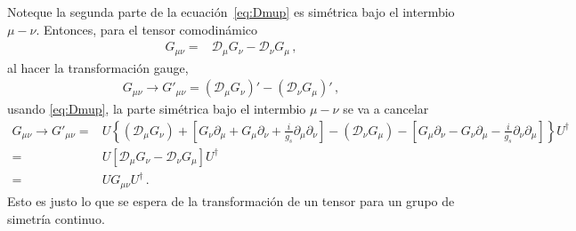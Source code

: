 Noteque la segunda parte de la ecuación~\eqref{eq:Dmup} es simétrica bajo el intermbio $\mu-\nu$. Entonces,  para el tensor comodinámico
\begin{align}
  \label{eq:gmunu3}
   {G}_{\mu\nu}= & \mathcal{D}_{\mu} {G}_{\nu}-\mathcal{D}_{\nu} {G}_{\mu}\,,
\end{align}
al hacer la transformación gauge, 
\begin{align}
   {G}_{\mu\nu}\to  {G}'_{\mu\nu}=\left( \mathcal{D}_{\mu} {G}_{\nu} \right)'-\left( \mathcal{D}_{\nu} {G}_{\mu}  \right)'\,,
\end{align}
usando \eqref{eq:Dmup}, la parte simétrica bajo el intermbio $\mu-\nu$ se va a cancelar
\begin{align}
\label{eq:ugum}
    {G}_{\mu\nu}\to  {G}'_{\mu\nu}=&  {U} \left\{ \left( \mathcal{D}_{\mu}{G}_\nu   \right)
    +  \left[ {G}_{\nu} \partial_{\mu}+{G}_{\mu}\partial_{\nu}+\frac{i}{g_s} \partial_{\mu}\partial_{\nu} \right]
  -   \left( \mathcal{D}_{\nu}{G}_\mu   \right)
    - \left[ {G}_{\mu} \partial_{\nu}-{G}_{\nu}\partial_{\mu}-\frac{i}{g_s} \partial_{\nu}\partial_{\mu} \right]  \right\} {U}^{\dagger} \nonumber\\
=&  {U} \left[  \mathcal{D}_{\mu}{G}_\nu 
    -   \mathcal{D}_{\nu}{G}_\mu
  \right] {U}^{\dagger} \nonumber\\
=& {U} {G}_{\mu\nu} {U}^{\dagger}\,.
\end{align}
Esto es justo lo que se espera de la transformación de un tensor para un grupo de simetría continuo.







\renewcommand{\labelenumi}{\theenumi} %

%
